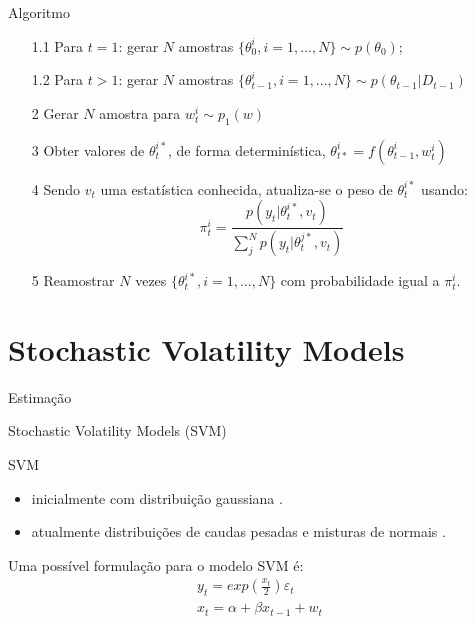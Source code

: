 \documentclass{beamer}
\begin{document}
\begin{frame}{Algoritmo}

\begin{itemize}
\item[1.1] Para $t=1$: gerar $N$ amostras $\{\theta_{0}^{i}, i= 1,...,N\} \sim p(\theta_0)$;
\item[1.2] Para $t>1$: gerar $N$ amostras $\{\theta_{t-1}^{i}, i= 1,...,N\}\sim p(\theta_{t-1}|D_{t-1})$
\end{itemize}
\begin{itemize}
\item[2] Gerar $N$ amostra para $w_{t}^{i} \sim p_1(w)$
\item[3] Obter valores de $\theta^{i*}_{t}$, de forma determinística, $\theta_{t*}^{i} = f(\theta_{t-1}^{i},w_{t}^{i})$
\item[4] Sendo $v_t$ uma estatística conhecida, atualiza-se o peso de $\theta^{i*}_{t}$ usando:
$$
\pi^{i}_t = \frac{p(y_t|\theta_t^{i*},v_t)}{\sum^N_j p(y_t|\theta_t^{j*},v_t)}
$$
\item[5] Reamostrar $N$ vezes $\{\theta_{t}^{i*}, i= 1,...,N\}$ com probabilidade igual a $\pi_{t}^{i}$.
\end{itemize}

\end{frame}



\section{Stochastic Volatility Models}
\begin{frame}{Estimação}
    \begin{block}{ }
      \Huge  Stochastic Volatility Models (SVM)
    \end{block}
\end{frame}





\begin{frame}{SVM}

\begin{itemize}
\item inicialmente com distribuição gaussiana \citep{HULL1987}.
\item atualmente distribuições de caudas pesadas e misturas de normais \citep{Virbickaite2016}.
\end{itemize}

Uma possível formulação para o modelo SVM é:
\begin{eqnarray}
y_t = exp\left(\frac{x_t}{2}\right)\varepsilon_t \nonumber \\
x_t = \alpha +  \beta x_{t-1} + w_t
\end{eqnarray}


\end{frame}
\end{document}
